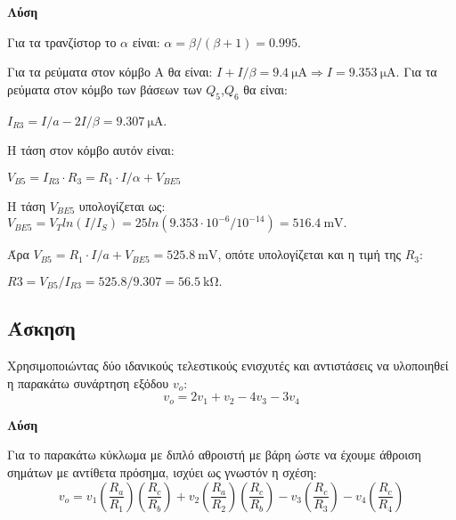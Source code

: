 \documentclass[11pt,a4paper,titlepage,fleqn]{article}
\begin{document}
	\textbf{Λύση}
	
	Για τα τρανζίστορ το $\alpha$ είναι: $\alpha = \beta / \left(\beta + 1\right) = 0.995$.
	
	Για τα ρεύματα στον κόμβο Α θα είναι: $I + I/\beta = \SI{9,4}{\micro\ampere} \Rightarrow I= \SI{9,353}{\micro\ampere}$.
	Για τα ρεύματα στον κόμβο των βάσεων των $Q_5$,$Q_6$ θα είναι:
	
	$I_{R3} = I / a - 2I/\beta = \SI{9,307}{\micro\ampere}$.
	
	Η τάση στον κόμβο αυτόν είναι:
	
	$V_{B5} = I_{R3} \cdot R_3 = R_1·I/\alpha + V_{BE5}$
	
	H τάση $V_{BE5}$ υπολογίζεται ως: $V_{BE5}= V_T ln(I/I_S) = 25 ln(9.353·10^{-6}/10^{-14}) =  \SI{516,4}{\milli\volt}.$
	
	Άρα $V_{B5} = R_1·I/a + V_{BE5}= \SI{525,8}{\milli\volt}$, οπότε υπολογίζεται και η τιμή της $R_3$:
	
	$R3 = V_{B5} / I_{R3} = 525.8 / 9.307 = \SI{56,5}{\kilo\ohm}.$
	
	\subsection{Άσκηση}
	
	Χρησιμοποιώντας δύο ιδανικούς τελεστικούς ενισχυτές και αντιστάσεις να υλοποιηθεί
	η παρακάτω συνάρτηση εξόδου $v_o$:
	\[v_o = 2v_1 + v_2 - 4v_3 - 3v_4\]
	
	\textbf{Λύση}
	
	Για το παρακάτω κύκλωμα με διπλό αθροιστή με βάρη ώστε να έχουμε άθροιση σημάτων
	με αντίθετα πρόσημα, ισχύει ως γνωστόν η σχέση:
	\[v_o = v_1 \left(\frac{R_a}{R_1}\right) \left(\frac{R_c}{R_b}\right) + v_2 \left(\frac{R_a}{R_2}\right) \left(\frac{R_c}{R_b}\right) - v_3 \left(\frac{R_c}{R_3}\right) - v_4\left(\frac{R_c}{R_4}\right) \]
	
\end{document}
